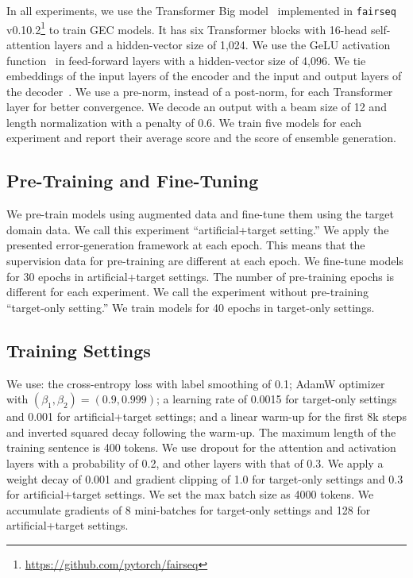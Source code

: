 \documentclass[11pt]{article}
\begin{document}
In all experiments, we use the Transformer Big model~\citep{NIPS2017_3f5ee243} implemented in \texttt{fairseq} v0.10.2\footnote{\url{https://github.com/pytorch/fairseq}} to train GEC models.
It has six Transformer blocks with 16-head self-attention layers and a hidden-vector size of 1,024.
We use the GeLU activation function~\citep{hendrycks2016gelu} in feed-forward layers with a hidden-vector size of 4,096.
We tie embeddings of the input layers of the encoder and the input and output layers of the decoder~\citep{press-wolf-2017-using}.
We use a pre-norm, instead of a post-norm, for each Transformer layer for better convergence.
We decode an output with a beam size of 12 and length normalization with a penalty of 0.6.
We train five models for each experiment and report their average score and the score of ensemble generation.

\subsection{Pre-Training and Fine-Tuning}

We pre-train models using augmented data and fine-tune them using the target domain data. 
We call this experiment ``artificial+target setting.''
We apply the presented error-generation framework at each epoch.
This means that the supervision data for pre-training are different at each epoch.
We fine-tune models for 30 epochs in artificial+target settings.
The number of pre-training epochs is different for each experiment.
We call the experiment without pre-training ``target-only setting.''
We train models for 40 epochs in target-only settings.

\subsection{Training Settings}

We use: the cross-entropy loss with label smoothing of 0.1;
AdamW optimizer~\citep{DBLP:conf/iclr/LoshchilovH19} with \mbox{$(\beta_1, \beta_2) = (0.9, 0.999)$};
a learning rate of 0.0015 for target-only settings and 0.001 for artificial+target settings;
and a linear warm-up for the first 8k steps and inverted squared decay following the warm-up.
The maximum length of the training sentence is 400 tokens.
We use dropout for the attention and activation layers with a probability of 0.2, and other layers with that of 0.3.
We apply a weight decay of 0.001 and gradient clipping of 1.0 for target-only settings and 0.3 for artificial+target settings.
We set the max batch size as 4000 tokens.
We accumulate gradients of 8 mini-batches for target-only settings and 128 for artificial+target settings.
\end{document}
